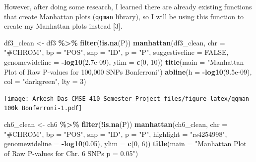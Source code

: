 \documentclass[
  12pt,
]{article}
\newenvironment{Shaded}{\begin{snugshade}}{\end{snugshade}}
\newcommand{\AttributeTok}[1]{\textcolor[rgb]{0.13,0.29,0.53}{#1}}
\newcommand{\ConstantTok}[1]{\textcolor[rgb]{0.56,0.35,0.01}{#1}}
\newcommand{\DecValTok}[1]{\textcolor[rgb]{0.00,0.00,0.81}{#1}}
\newcommand{\FloatTok}[1]{\textcolor[rgb]{0.00,0.00,0.81}{#1}}
\newcommand{\FunctionTok}[1]{\textcolor[rgb]{0.13,0.29,0.53}{\textbf{#1}}}
\newcommand{\NormalTok}[1]{#1}
\newcommand{\OtherTok}[1]{\textcolor[rgb]{0.56,0.35,0.01}{#1}}
\newcommand{\SpecialCharTok}[1]{\textcolor[rgb]{0.81,0.36,0.00}{\textbf{#1}}}
\newcommand{\StringTok}[1]{\textcolor[rgb]{0.31,0.60,0.02}{#1}}
\begin{document}
However, after doing some research, I learned there are already existing
functions that create Manhattan plots (\texttt{qqman} library), so I
will be using this function to create my Manhattan plots instead
{[}3{]}.

\begin{Shaded}
\begin{Highlighting}[]
\NormalTok{df3\_clean }\OtherTok{\textless{}{-}}\NormalTok{ df3 }\SpecialCharTok{\%\textgreater{}\%}
  \FunctionTok{filter}\NormalTok{(}\SpecialCharTok{!}\FunctionTok{is.na}\NormalTok{(P))}
\FunctionTok{manhattan}\NormalTok{(df3\_clean, }\AttributeTok{chr =} \StringTok{"\#CHROM"}\NormalTok{, }\AttributeTok{bp =} \StringTok{"POS"}\NormalTok{, }\AttributeTok{snp =} \StringTok{"ID"}\NormalTok{, }\AttributeTok{p =} \StringTok{"P"}\NormalTok{, }\AttributeTok{suggestiveline =} \ConstantTok{FALSE}\NormalTok{,}
          \AttributeTok{genomewideline =} \SpecialCharTok{{-}}\FunctionTok{log10}\NormalTok{(}\FloatTok{2.7e{-}09}\NormalTok{), }\AttributeTok{ylim =} \FunctionTok{c}\NormalTok{(}\DecValTok{0}\NormalTok{, }\DecValTok{10}\NormalTok{)) }
\FunctionTok{title}\NormalTok{(}\AttributeTok{main =} \StringTok{"Manhattan Plot of Raw P{-}values for 100,000 SNPs Bonferroni"}\NormalTok{)}
\FunctionTok{abline}\NormalTok{(}\AttributeTok{h =} \SpecialCharTok{{-}}\FunctionTok{log10}\NormalTok{(}\FloatTok{9.5e{-}09}\NormalTok{), }\AttributeTok{col =} \StringTok{"darkgreen"}\NormalTok{, }\AttributeTok{lty =} \DecValTok{3}\NormalTok{)}
\end{Highlighting}
\end{Shaded}

\texttt{[image: Arkesh\_Das\_CMSE\_410\_Semester\_Project\_files/figure-latex/qqman 100k Bonferroni-1.pdf]}

\begin{Shaded}
\begin{Highlighting}[]
\NormalTok{ch6\_clean }\OtherTok{\textless{}{-}}\NormalTok{ ch6 }\SpecialCharTok{\%\textgreater{}\%}
  \FunctionTok{filter}\NormalTok{(}\SpecialCharTok{!}\FunctionTok{is.na}\NormalTok{(P))}
\FunctionTok{manhattan}\NormalTok{(ch6\_clean, }\AttributeTok{chr =} \StringTok{"\#CHROM"}\NormalTok{, }\AttributeTok{bp =} \StringTok{"POS"}\NormalTok{, }\AttributeTok{snp =} \StringTok{"ID"}\NormalTok{, }\AttributeTok{p =} \StringTok{"P"}\NormalTok{, }\AttributeTok{highlight =} \StringTok{"rs4254998"}\NormalTok{,}
          \AttributeTok{genomewideline =} \SpecialCharTok{{-}}\FunctionTok{log10}\NormalTok{(}\FloatTok{0.05}\NormalTok{), }\AttributeTok{ylim =} \FunctionTok{c}\NormalTok{(}\DecValTok{0}\NormalTok{, }\DecValTok{6}\NormalTok{)) }
\FunctionTok{title}\NormalTok{(}\AttributeTok{main =} \StringTok{"Manhattan Plot of Raw P{-}values for Chr. 6 SNPs p = 0.05"}\NormalTok{)}
\end{Highlighting}
\end{Shaded}
\end{document}
